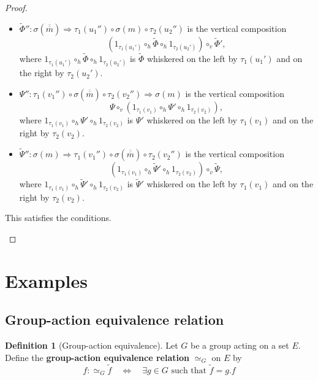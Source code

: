 \documentclass[a4paper,10pt]{article}
\theoremstyle{plain}
\theoremstyle{definition}
\newtheorem{definition}[theorem]{Definition}
\theoremstyle{remark}
\begin{document}
\begin{proof}
\begin{itemize}
\begin{itemize}
            \item \(\tilde{\Phi}'': \sigma(\overline{\overline{m}}) \Rightarrow \tau_1(u_1'') \circ \sigma(m) \circ \tau_2(u_2'')\) is the vertical composition
                  \[ \left( 1_{\tau_1(u_1')} \circ_h \tilde{\Phi} \circ_h 1_{\tau_2(u_2')} \right) \circ_v \tilde{\Phi}', \]
                  where $1_{\tau_1(u_1')} \circ_h \tilde{\Phi} \circ_h 1_{\tau_2(u_2')}$ is \(\tilde{\Phi}\) whiskered on the left by \(\tau_1(u_1')\) and on the right by \(\tau_2(u_2')\).
            \item \(\Psi'': \tau_1(v_1'') \circ \sigma(\overline{\overline{m}}) \circ \tau_2(v_2'') \Rightarrow \sigma(m)\) is the vertical composition
                  \[ \Psi \circ_v \left( 1_{\tau_1(v_1)} \circ_h \Psi' \circ_h 1_{\tau_2(v_2)} \right), \]
                  where $1_{\tau_1(v_1)} \circ_h \Psi' \circ_h 1_{\tau_2(v_2)}$ is \(\Psi'\) whiskered on the left by \(\tau_1(v_1)\) and on the right by \(\tau_2(v_2)\).
            \item \(\tilde{\Psi}'': \sigma(m) \Rightarrow \tau_1(v_1'') \circ \sigma(\overline{\overline{m}}) \circ \tau_2(v_2'')\) is the vertical composition
                  \[ \left( 1_{\tau_1(v_1)} \circ_h \tilde{\Psi}' \circ_h 1_{\tau_2(v_2)} \right) \circ_v \tilde{\Psi}, \] where $1_{\tau_1(v_1)} \circ_h \tilde{\Psi}' \circ_h 1_{\tau_2(v_2)}$ is \(\tilde{\Psi}'\) whiskered on the left by \(\tau_1(v_1)\) and on the right by \(\tau_2(v_2)\).
          \end{itemize}
          This satisfies the conditions.
  \end{itemize}
\end{proof}





\section{Examples}
\label{section-examples}

\subsection{Group-action equivalence relation}

\begin{definition}[Group-action equivalence]
  \label{definition-group-equivalence}
  Let $G$ be a group acting on a set $E$.
  Define the \textbf{group-action equivalence relation} $\simeq_G$ on $E$ by
  \[
    f :\simeq_G \tilde{f} \quad \Longleftrightarrow \quad \exists g \in G \text{ such that } \tilde{f} = g. f
  \]
\end{definition}
\end{document}
